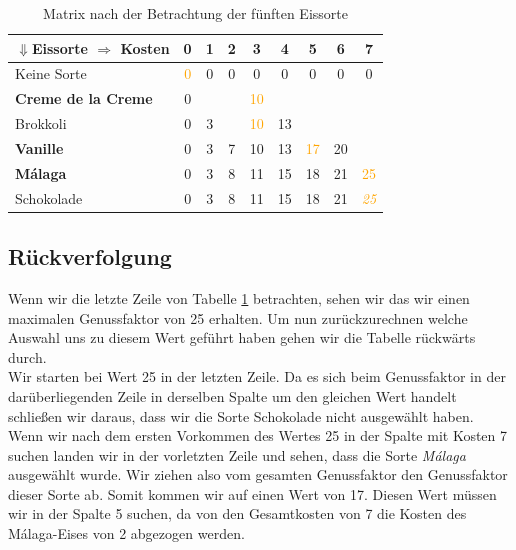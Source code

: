 \documentclass[a4paper, 12pt]{article}
\begin{document}
\begin{table}[H]
	\begin{center}
		\begin{tabular}{l|cccccccc}
			$⇓$Eissorte $⇒$ Kosten & 0 & 1 & 2 & 3 & 4 & 5 &
				6 & 7\\
			\hline
			Keine Sorte			& \textcolor{orange}{0} & 0 & 0 & 0	& 0 & 0 &
				0 & 0\\
			\textbf{Creme de la Creme} & 0 & & & \textcolor{orange}{10} & & &
				&\\
			Brokkoli			& 0 & 3 & & \textcolor{orange}{10} & 13 & &
				&\\
			\textbf{Vanille}	& 0 & 3 & 7 & 10 & 13 & \textcolor{orange}{17} &
				20 &\\
			\textbf{Málaga}		& 0 & 3 & 8 & 11 & 15 & 18 & 21
				& \textcolor{orange}{25}\\
			Schokolade			& 0 & 3 & 8 & 11 & 15 & 18 & 21
				& \textcolor{orange}{\emph{25}}\\
		\end{tabular}
	\end{center}
\caption{Matrix nach der Betrachtung der fünften Eissorte}
\label{table:5_Eis}
\end{table}

\subsection{Rückverfolgung}

Wenn wir die letzte Zeile von Tabelle \ref{table:5_Eis} betrachten, sehen wir
das wir einen maximalen Genussfaktor von 25 erhalten. Um nun zurückzurechnen
welche Auswahl uns zu diesem Wert geführt haben gehen wir die Tabelle
rückwärts durch.\\

Wir starten bei Wert 25 in der letzten Zeile. Da es sich beim Genussfaktor in
der darüberliegenden Zeile in derselben Spalte um den gleichen Wert handelt
schließen wir daraus, dass wir die Sorte Schokolade nicht ausgewählt haben.\\

Wenn wir nach dem ersten Vorkommen des Wertes 25 in der Spalte mit Kosten 7
suchen landen wir in der vorletzten Zeile und sehen, dass die Sorte
\emph{Málaga} ausgewählt wurde. Wir ziehen also vom gesamten Genussfaktor den
Genussfaktor dieser Sorte ab. Somit kommen wir auf einen Wert von 17. Diesen
Wert müssen wir in der Spalte 5 suchen, da von den Gesamtkosten von 7 die
Kosten des Málaga-Eises von 2 abgezogen werden.\\
\end{document}
